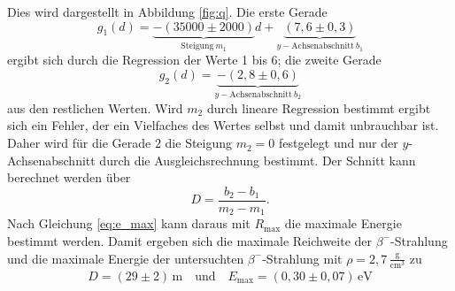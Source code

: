 Dies wird dargestellt in Abbildung \ref{fig:q}.
Die erste Gerade
\begin{equation}
g_1(d)=\underbrace{-(35000\pm2000)}_{\text{Steigung}\:m_1}d+\underbrace{(7,6\pm0,3)}_{y-\text{Achsenabschnitt}\:b_1}
\end{equation}
ergibt sich durch die Regression der Werte 1 bis 6; die zweite Gerade
\begin{equation}
g_2(d)=\underbrace{-(2,8\pm0,6)}_{y-\text{Achsenabschnitt}\: b_2}
\end{equation}
aus den restlichen Werten. Wird $m_2$ durch lineare Regression bestimmt ergibt sich ein Fehler, der ein Vielfaches des Wertes selbst und damit unbrauchbar ist. Daher wird für die Gerade $2$ die Steigung $m_2=0$ festgelegt und nur der $y$-Achsenabschnitt durch die Ausgleichsrechnung bestimmt. 
Der Schnitt kann berechnet werden über 
\begin{equation}
D=\frac{b_2-b_1}{m_2-m_1}.
\end{equation}
Nach Gleichung \eqref{eq:e_max} kann daraus mit $R_\mathup{max}$ die maximale Energie bestimmt werden. Damit ergeben sich die maximale Reichweite der $\beta^-$-Strahlung und die maximale Energie der untersuchten $\beta^-$-Strahlung mit $\rho=2,7\,\frac{\si\gram}{\si{\centi}\si{\meter}^3}$ zu
\begin{align}
D=(29\pm2)\,\si\meter \quad\text{und}\quad E_\mathup{max}=(0,30\pm0,07)\,\mathup{e}\si\volt
\end{align}
